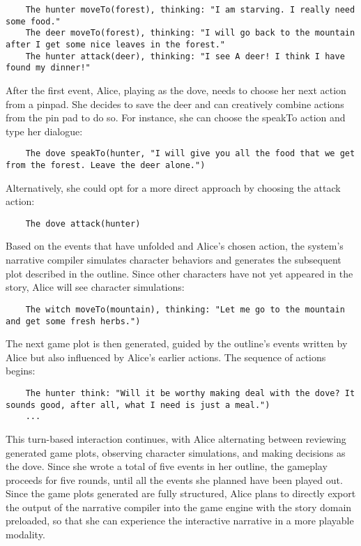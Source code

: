 \begin{verbatim}
    The hunter moveTo(forest), thinking: "I am starving. I really need some food."
    The deer moveTo(forest), thinking: "I will go back to the mountain after I get some nice leaves in the forest."
    The hunter attack(deer), thinking: "I see A deer! I think I have found my dinner!"
\end{verbatim}
After the first event, Alice, playing as the dove, needs to choose her next action from a pinpad. She decides to save the deer and can creatively combine actions from the pin pad to do so. For instance, she can choose the speakTo action and type her dialogue:
\begin{verbatim}
    The dove speakTo(hunter, "I will give you all the food that we get from the forest. Leave the deer alone.")
\end{verbatim}
Alternatively, she could opt for a more direct approach by choosing the attack action:
\begin{verbatim}
    The dove attack(hunter)
\end{verbatim}
Based on the events that have unfolded and Alice’s chosen action, the system’s narrative compiler simulates character behaviors and generates the subsequent plot described in the outline. Since other characters have not yet appeared in the story, Alice will see character simulations:
\begin{verbatim}
    The witch moveTo(mountain), thinking: "Let me go to the mountain and get some fresh herbs.")
\end{verbatim}
The next game plot is then generated, guided by the outline’s events written by Alice but also influenced by Alice’s earlier actions. The sequence of actions  begins:
\begin{verbatim}
    The hunter think: "Will it be worthy making deal with the dove? It sounds good, after all, what I need is just a meal.")
    ...
\end{verbatim}
This turn-based interaction continues, with Alice alternating between reviewing generated game plots, observing character simulations, and making decisions as the dove. Since she wrote a total of five events in her outline, the gameplay proceeds for five rounds, until all the events she planned have been played out. Since the game plots generated are fully structured, Alice plans to directly export the output of the narrative compiler into the game engine with the story domain preloaded, so that she can experience the interactive narrative in a more playable modality.

